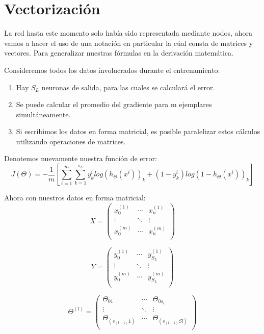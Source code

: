 \section{Vectorización}
La red hasta este momento solo había sido representada mediante nodos, ahora vamos a hacer el uso de una notación en particular la cúal consta de matrices y vectores. Para generalizar nuestras fórmulas en la derivación matemática. %

Consideremos todos los datos involucrados durante el entrenamiento:
\begin{enumerate}
 \item Hay $S_{L}$ neuronas de salida, para las cuales se calculará el error.
 \item Se puede calcular el promedio del gradiente para m ejemplares simultáneamente.
 \item Si escribimos los datos en forma matricial, es posible paralelizar estos cálculos utilizando operaciones de matrices.
\end{enumerate}
Denotemos nuevamente nuestra función de error:
 \begin{equation}
  J (\Theta) = -\dfrac{1}{m}\left[\sum_{i=1}^{m}\sum_{k=1}^{s_{L}}y_{k}^{i} log( h_{\Theta}(x^i))_{k}+(1-y_{k}^{i})log(1- h_{\Theta}(x^i))_{k}  \right]  
 \end{equation}

Ahora con nuestros datos en forma matricial:
\begin{equation}
X = 
\begin{pmatrix}
x_{0}^{(1)} & \cdots & x_{n}^{(1)}\\
\vdots & \ddots & \vdots\\
x_{0}^{(m)} & \cdots & x_{n}^{(m)}\\
\end{pmatrix}
\end{equation}


\begin{equation}
Y = 
\begin{pmatrix}
y_{0}^{(1)} & \cdots & y_{S_{L}}^{(1)}\\
\vdots & \ddots & \vdots\\
y_{0}^{(m)} & \cdots & y_{S_{L}}^{(m)}\\
\end{pmatrix}
\end{equation}


\begin{equation}
\Theta^{(l)} = 
\begin{pmatrix}
\Theta_{01} & \cdots & \Theta_{0s_{l}}\\
\vdots & \ddots & \vdots\\
\Theta_{(s_{(l-1)}1)} & \cdots & \Theta_{(s_{(l-1)}Sl)}\\
\end{pmatrix}
\end{equation}

